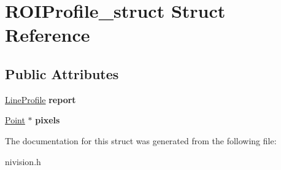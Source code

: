 \hypertarget{structROIProfile__struct}{
\section{ROIProfile\_\-struct Struct Reference}
\label{structROIProfile__struct}
}
\subsection*{Public Attributes}
\begin{DoxyCompactItemize}
\item 
\hypertarget{structROIProfile__struct_af136d9778151da591f0853758e1eb21b}{
\hyperlink{structLineProfile__struct}{LineProfile} {\bfseries report}}
\label{structROIProfile__struct_af136d9778151da591f0853758e1eb21b}

\item 
\hypertarget{structROIProfile__struct_a83ea104b88d7a3548bc75d0ed67eb5d9}{
\hyperlink{structPoint__struct}{Point} $\ast$ {\bfseries pixels}}
\label{structROIProfile__struct_a83ea104b88d7a3548bc75d0ed67eb5d9}

\end{DoxyCompactItemize}


The documentation for this struct was generated from the following file:\begin{DoxyCompactItemize}
\item 
nivision.h\end{DoxyCompactItemize}
